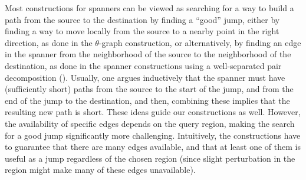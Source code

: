 Most constructions for spanners can be viewed as searching for a way
to build a path from the source to the destination by finding a
``good'' jump, either by finding a way to move locally from the source
to a nearby point in the right direction, as done in the
$\theta$-graph construction, or alternatively, by finding an edge in
the spanner from the neighborhood of the source to the neighborhood of
the destination, as done in the spanner constructions using a
well-separated pair decomposition (\WSPD). Usually, one argues
inductively that the spanner must have (sufficiently short) paths from
the source to the start of the jump, and from the end of the jump to
the destination, and then, combining these implies that the resulting
new path is short.  These ideas guide our constructions as
well. However, the availability of specific edges depends on the query
region, making the search for a good jump significantly more
challenging. Intuitively, the constructions have to guarantee that
there are many edges available, and that at least one of them is
useful as a jump regardless of the chosen region (since slight
perturbation in the region might make many of these edges
unavailable).

